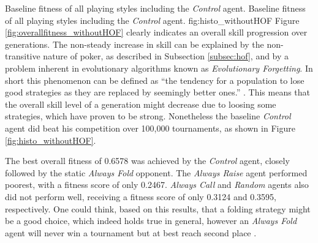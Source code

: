   {Baseline fitness of all playing styles including the \textit{Control} agent.}%
  {Baseline fitness of all playing styles including the \textit{Control} agent.}%
  {fig:histo_withoutHOF}%
Figure \ref{fig:overallfitness_withoutHOF} clearly indicates an overall skill progression over generations. The non-steady increase in skill can be explained by the non-transitive nature of poker, as described in Subsection \ref{subsec:hof}, and by a problem inherent in evolutionary algorithms known as \textit{Evolutionary Forgetting}. In short this phenomenon can be defined as \enquote{the tendency for a population to lose good strategies as they are replaced by seemingly better ones.} \cite[p.63]{evolutionary_methods}. This means that the overall skill level of a generation might decrease due to loosing some strategies, which have proven to be strong. Nonetheless the baseline \textit{Control} agent did beat his competition over 100,000 tournaments, as shown in Figure \ref{fig:histo_withoutHOF}.\par
The best overall fitness of 0.6578 was achieved by the \textit{Control} agent, closely followed by the static \textit{Always Fold} opponent. The \textit{Always Raise} agent performed poorest, with a fitness score of only 0.2467. \textit{Always Call} and \textit{Random} agents also did not perform well, receiving a fitness score of only 0.3124 and 0.3595, respectively. One could think, based on this results, that a folding strategy might be a good choice, which indeed holds true in general, however an \textit{Always Fold} agent will never win a tournament but at best reach second place \cite{evolutionary_methods}.
